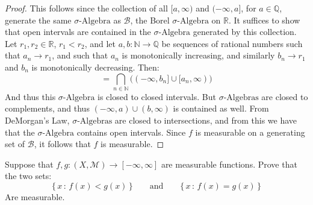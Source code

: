 \documentclass[crop=false,class=article]{standalone}                       %
\begin{document}
    \begin{proof}
        This follows since the collection of all $[a,\infty)$ and
        $(\minus\infty,a]$, for $a\in\mathbb{Q}$, generate the same
        $\sigma\textrm{-Algebra}$ as $\mathcal{B}$, the Borel
        $\sigma\textrm{-Algebra}$ on $\mathbb{R}$. It suffices to show
        that open intervals are contained in the $\sigma\textrm{-Algebra}$
        generated by this collection. Let
        $r_{1},r_{2}\in\mathbb{R}$, $r_{1}<r_{2}$, and let
        $a,b:\mathbb{N}\rightarrow\mathbb{Q}$ be sequences of rational
        numbers such that $a_{n}\rightarrow{r}_{1}$, and such that
        $a_{n}$ is monotonically increasing, and similarly
        $b_{n}\rightarrow{r}_{1}$ and $b_{n}$ is monotonically decreasing.
        Then:
        \begin{equation}
            [r_{1},r_{2}]
            =\bigcap_{n\in\mathbb{N}}
                \Big((\minus\infty,b_{n}]\cup[a_{n},\infty)\Big)
        \end{equation}
        And thus this $\sigma\textrm{-Algebra}$ is closed to closed
        intervals. But $\sigma\textrm{-Algebras}$ are closed to
        complements, and thus $(\minus{\infty},a)\cup(b,\infty)$ is
        contained as well. From DeMorgan's Law, $\sigma\textrm{-Algebras}$
        are closed to intersections, and from this we have that the
        $\sigma\textrm{-Algebra}$ contains open intervals. Since
        $f$ is measurable on a generating set of $\mathcal{B}$, it follows
        that $f$ is measurable.
    \end{proof}
    \begin{problem}
        Suppose that $f,g:(X,\mathcal{M})\rightarrow[\minus\infty,\infty]$
        are measurable functions. Prove that the two sets:
        \begin{equation}
            \{\,x\,:\,f(x)<g(x)\,\}
            \quad\quad
            \textrm{and}
            \quad\quad
            \{\,x\,:\,f(x)=g(x)\,\}
        \end{equation}
        Are measurable.
    \end{problem}
\end{document}
